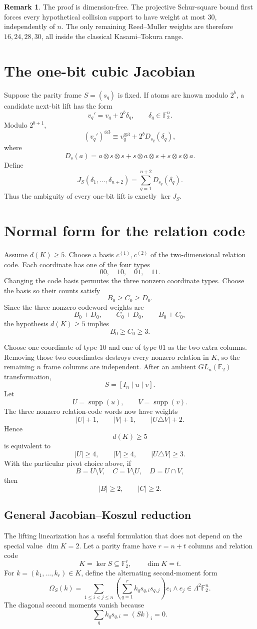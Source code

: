 \documentclass[11pt]{article}
\theoremstyle{definition}
\newtheorem{remark}[theorem]{Remark}
\newcommand{\F}{\mathbb F}
\newcommand{\supp}{\operatorname{supp}}
\begin{document}
\begin{remark}
The proof is dimension-free. The projective Schur-square bound first forces every hypothetical collision support to have weight at most \(30\), independently of \(n\). The only remaining Reed--Muller weights are therefore \(16,24,28,30\), all inside the classical Kasami--Tokura range.
\end{remark}

\section{The one-bit cubic Jacobian}
Suppose the parity frame \(S=(s_q)\) is fixed. If atoms are known modulo \(2^b\), a candidate next-bit lift has the form
\[
v_q'=v_q+2^b\delta_q,
\qquad
\delta_q\in\F_2^n.
\]
Modulo \(2^{b+1}\),
\[
(v_q')^{\otimes3}
\equiv
v_q^{\otimes3}
+
2^b D_{s_q}(\delta_q),
\]
where
\[
D_s(a)
=
a\otimes s\otimes s
+s\otimes a\otimes s
+s\otimes s\otimes a.
\]
Define
\[
J_S(\delta_1,\ldots,\delta_{n+2})
=
\sum_{q=1}^{n+2}D_{s_q}(\delta_q).
\]
Thus the ambiguity of every one-bit lift is exactly \(\ker J_S\).

\section{Normal form for the relation code}
Assume \(d(K)\ge5\). Choose a basis \(c^{(1)},c^{(2)}\) of the two-dimensional relation code. Each coordinate has one of the four types
\[
00,\quad10,\quad01,\quad11.
\]
Changing the code basis permutes the three nonzero coordinate types. Choose the basis so their counts satisfy
\[
B_0\ge C_0\ge D_0.
\]
Since the three nonzero codeword weights are
\[
B_0+D_0,\qquad
C_0+D_0,\qquad
B_0+C_0,
\]
the hypothesis \(d(K)\ge5\) implies
\[
B_0\ge C_0\ge3.
\]

Choose one coordinate of type \(10\) and one of type \(01\) as the two extra columns. Removing those two coordinates destroys every nonzero relation in \(K\), so the remaining \(n\) frame columns are independent. After an ambient \(GL_n(\F_2)\) transformation,
\[
S=[I_n\mid u\mid v].
\]
Let
\[
U=\supp(u),\qquad V=\supp(v).
\]
The three nonzero relation-code words now have weights
\[
|U|+1,\qquad |V|+1,\qquad |U\triangle V|+2.
\]
Hence
\[
d(K)\ge5
\]
is equivalent to
\[
|U|\ge4,\qquad
|V|\ge4,\qquad
|U\triangle V|\ge3.
\]
With the particular pivot choice above, if
\[
B=U\setminus V,\quad
C=V\setminus U,\quad
D=U\cap V,
\]
then
\[
|B|\ge2,\qquad |C|\ge2.
\]


\subsection{General Jacobian--Koszul reduction}
The lifting linearization has a useful formulation that does not depend on the special value \(\dim K=2\). Let a parity frame have \(r=n+t\) columns and relation code
\[
K=\ker S\subseteq\F_2^r,
\qquad
\dim K=t.
\]
For \(k=(k_1,\ldots,k_r)\in K\), define the alternating second-moment form
\[
\Omega_S(k)
=
\sum_{1\le i<j\le n}
\left(
\sum_{q=1}^r k_q s_{q,i}s_{q,j}
\right)e_i\wedge e_j
\in\Lambda^2\F_2^n.
\]
The diagonal second moments vanish because
\[
\sum_qk_qs_{q,i}=(Sk)_i=0.
\]
\end{document}

